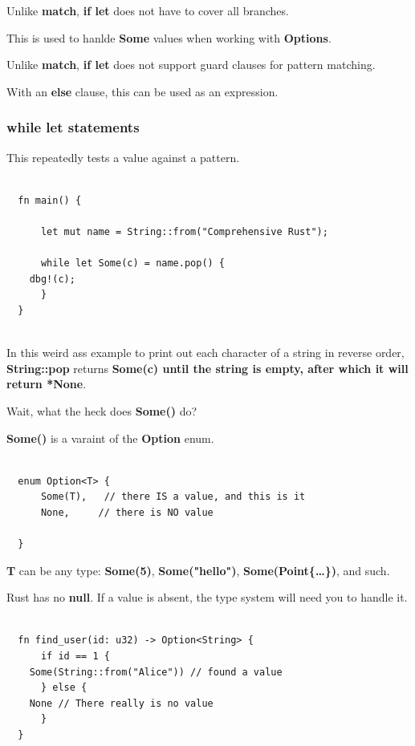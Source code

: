 \documentclass[11pt]{article}
\begin{document}
Unlike \textbf{match}, \textbf{if let} does not have to cover all branches.

This is used to hanlde \textbf{Some} values when working with \textbf{Options}.

Unlike \textbf{match}, \textbf{if let} does not support guard clauses for pattern matching.

With an \textbf{else} clause, this can be used as an expression.
\subsubsection{while let statements}
\label{sec:org9ce7eb6}

This repeatedly tests a value against a pattern.

\begin{verbatim}

  fn main() {

      let mut name = String::from("Comprehensive Rust");

      while let Some(c) = name.pop() {
  	dbg!(c);
      }
  }


\end{verbatim}

In this weird ass example to print out each character of a string in reverse order, \textbf{String::pop} returns \textbf{Some(c) until the string is empty, after which it will return *None}.

Wait, what the heck does \textbf{Some()} do?

\textbf{Some()} is a varaint of the \textbf{Option} enum.

\begin{verbatim}

  enum Option<T> {
      Some(T),   // there IS a value, and this is it
      None,     // there is NO value
      
  }

\end{verbatim}

\textbf{T} can be any type: \textbf{Some(5)}, \textbf{Some("hello")}, \textbf{Some(Point\{\ldots{}\})}, and such.

Rust has no \textbf{null}. If a value is absent, the type system will need you to handle it.

\begin{verbatim}

  fn find_user(id: u32) -> Option<String> {
      if id == 1 {
  	Some(String::from("Alice")) // found a value
      } else {
  	None // There really is no value 
      }
  }

\end{verbatim}
\end{document}
